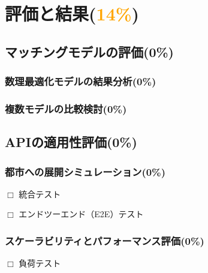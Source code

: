 \section{評価と結果(\textcolor{orange}{14\%})}
  \label{sec:評価と結果}
    \par
  
  \subsection{マッチングモデルの評価(0\%)}
    \label{sec:マッチングモデルの評価}
      \par
  
      \subsubsection{数理最適化モデルの結果分析(0\%)}
        \label{sec:数理最適化モデルの結果分析}
          \par
          
      \subsubsection{複数モデルの比較検討(0\%)}
        \label{sec:複数モデルの比較検討}
          \par
      
  \subsection{APIの適用性評価(0\%)}
    \label{sec:APIの適用性評価}
      \par
      
      \subsubsection{都市への展開シミュレーション(0\%)}
        \label{sec:都市への展開シミュレーション}
          \par $\Box$ 統合テスト
          \par $\Box$ エンドツーエンド（E2E）テスト
          
      \subsubsection{スケーラビリティとパフォーマンス評価(0\%)}
        \label{sec:スケーラビリティとパフォーマンス評価}
          \par $\Box$ 負荷テスト

